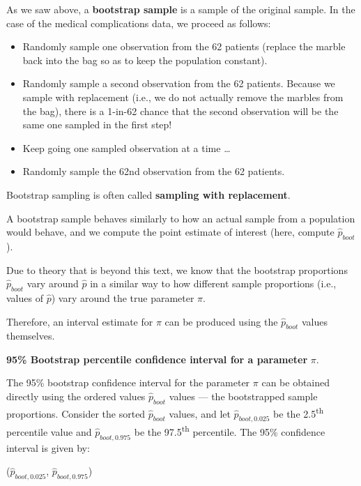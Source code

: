 \documentclass[
  10pt,
  openany]{book}
\providecommand{\tightlist}{%
  \setlength{\itemsep}{0pt}\setlength{\parskip}{0pt}}
\theoremstyle{definition}
\theoremstyle{definition}
\theoremstyle{definition}
\theoremstyle{definition}
\theoremstyle{remark}
\begin{document}
As we saw above, a \textbf{bootstrap sample} is a sample of the original sample.
In the case of the medical complications data, we proceed as follows:

\begin{itemize}
\tightlist
\item
  Randomly sample one observation from the 62 patients (replace the marble back into the bag so as to keep the population constant).
\item
  Randomly sample a second observation from the 62 patients. Because we sample with replacement (i.e., we do not actually remove the marbles from the bag), there is a 1-in-62 chance that the second observation will be the same one sampled in the first step!
\item
  Keep going one sampled observation at a time \ldots{}
\item
  Randomly sample the 62nd observation from the 62 patients.
\end{itemize}

Bootstrap sampling is often called \textbf{sampling with replacement}.

A bootstrap sample behaves similarly to how an actual sample from a population would behave, and we compute the point estimate of interest (here, compute \(\hat{p}_{boot}\)).

Due to theory that is beyond this text, we know that the bootstrap proportions \(\hat{p}_{boot}\) vary around \(\hat{p}\) in a similar way to how different sample proportions (i.e., values of \(\hat{p}\)) vary around the true parameter \(\pi.\)

Therefore, an interval estimate for \(\pi\) can be produced using the \(\hat{p}_{boot}\) values themselves.

\begin{onebox}

\textbf{95\% Bootstrap percentile confidence interval for a parameter} \(\pi.\)

The 95\% bootstrap confidence interval for the parameter \(\pi\) can be obtained directly using the ordered values \(\hat{p}_{boot}\) values --- the bootstrapped sample proportions. Consider the sorted \(\hat{p}_{boot}\) values, and let \(\hat{p}_{boot, 0.025}\) be the 2.5\textsuperscript{th} percentile value and \(\hat{p}_{boot, 0.975}\) be the 97.5\textsuperscript{th} percentile. The 95\% confidence interval is given by:

(\(\hat{p}_{boot, 0.025}\), \(\hat{p}_{boot, 0.975}\))

\end{onebox}
\end{document}
